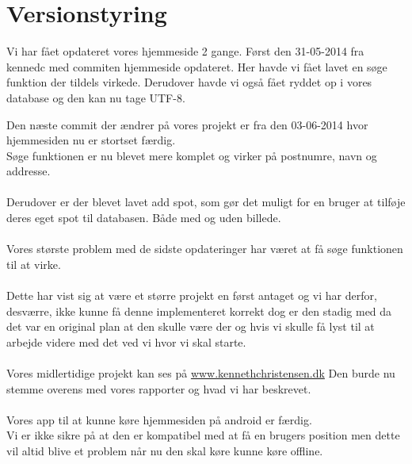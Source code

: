\documentclass[12pt]{article}
\begin{document}
\section{Versionstyring}
Vi har fået opdateret vores hjemmeside 2 gange. Først den 31-05-2014 fra kennedc med commiten hjemmeside opdateret. Her havde vi fået lavet en søge funktion der tildels virkede. Derudover havde vi også fået ryddet op i vores database og den kan nu tage UTF-8.

Den næste commit der ændrer på vores projekt er fra den 03-06-2014 hvor hjemmesiden nu er stortset færdig.\\ Søge funktionen er nu blevet mere komplet og virker på postnumre, navn og addresse.\\\\
Derudover er der blevet lavet add spot, som gør det muligt for en bruger at tilføje deres eget spot til databasen. Både med og uden billede.\\\\
Vores største problem med de sidste opdateringer har været at få søge funktionen til at virke. \\\\
Dette har vist sig at være et større projekt en først antaget og vi har derfor, desværre, ikke kunne få denne implementeret korrekt dog er den stadig med da det var en original plan at den skulle være der og hvis vi skulle få lyst til at arbejde videre med det ved vi hvor vi skal starte. \\\\
Vores midlertidige projekt kan ses på \url{www.kennethchristensen.dk} Den burde nu stemme overens med vores rapporter og hvad vi har beskrevet.\\\\
Vores app til at kunne køre hjemmesiden på android er færdig.\\
Vi er ikke sikre på at den er kompatibel med at få en brugers position men dette vil altid blive et problem når nu den skal køre kunne køre offline.\\

\pagebreak
\end{document}
